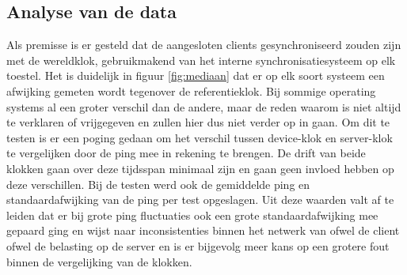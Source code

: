 \subsection{Analyse van de data}
\label{analyse}
Als premisse is er gesteld dat de aangesloten clients gesynchroniseerd zouden zijn met de wereldklok, gebruikmakend van het interne synchronisatiesysteem op elk toestel. Het is duidelijk in figuur \ref{fig:mediaan} dat er op elk soort systeem een afwijking gemeten wordt tegenover de referentieklok. Bij sommige operating systems al een groter verschil dan de andere, maar de reden waarom is niet altijd te verklaren of vrijgegeven en zullen hier dus niet verder op in gaan. Om dit te testen is er een poging gedaan om het verschil tussen device-klok en server-klok te vergelijken door de ping mee in rekening te brengen. De drift van beide klokken gaan over deze tijdsspan minimaal zijn en gaan geen invloed hebben op deze verschillen. Bij de testen werd ook de gemiddelde ping en standaardafwijking van de ping per test opgeslagen. Uit deze waarden valt af te leiden dat er bij grote ping fluctuaties ook een grote standaardafwijking mee gepaard ging en wijst naar inconsistenties binnen het netwerk van ofwel de client ofwel de belasting op de server en is er bijgevolg meer kans op een grotere fout binnen de vergelijking van de klokken.

